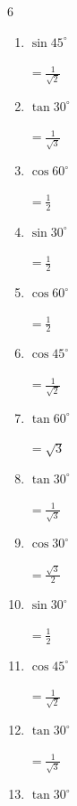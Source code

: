 \begin{multicols}{6}
\begin{enumerate}
        $\displaystyle =1$

\columnbreak %

  \item $\displaystyle \sin{45^\circ}$

        $\displaystyle =\frac{1}{\sqrt{2}}$

  \item $\displaystyle \tan{30^\circ}$

        $\displaystyle =\frac{1}{\sqrt{3}}$

  \item $\displaystyle \cos{60^\circ}$

        $\displaystyle =\frac{1}{2}$

  \item $\displaystyle \sin{30^\circ}$

        $\displaystyle =\frac{1}{2}$

  \item $\displaystyle \cos{60^\circ}$

        $\displaystyle =\frac{1}{2}$

  \item $\displaystyle \cos{45^\circ}$

        $\displaystyle =\frac{1}{\sqrt{2}}$

  \item $\displaystyle \tan{60^\circ}$

        $\displaystyle =\sqrt{3}$

  \item $\displaystyle \tan{30^\circ}$

        $\displaystyle =\frac{1}{\sqrt{3}}$

  \item $\displaystyle \cos{30^\circ}$

        $\displaystyle =\frac{\sqrt{3}}{2}$

  \item $\displaystyle \sin{30^\circ}$

        $\displaystyle =\frac{1}{2}$

  \item $\displaystyle \cos{45^\circ}$

        $\displaystyle =\frac{1}{\sqrt{2}}$

  \item $\displaystyle \tan{30^\circ}$

        $\displaystyle =\frac{1}{\sqrt{3}}$

  \item $\displaystyle \tan{30^\circ}$


\end{enumerate}
\end{multicols}
